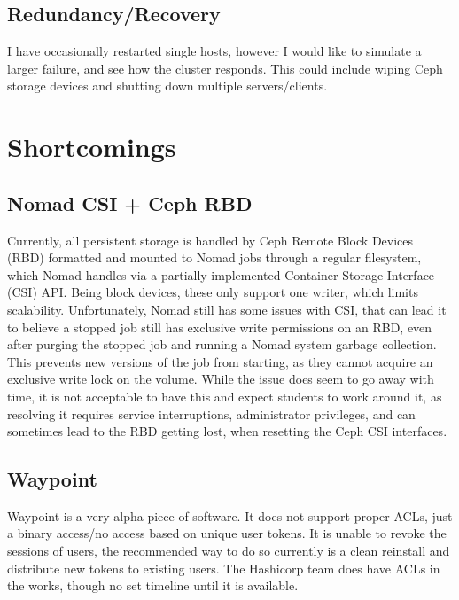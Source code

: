 \documentclass{article}
\begin{document}
\subsection{Redundancy/Recovery}
I have occasionally restarted single hosts, however I would like to simulate a larger failure, and see how the cluster responds. This could include wiping Ceph storage devices and shutting down multiple servers/clients.

\section{Shortcomings}
\subsection{Nomad CSI + Ceph RBD}
Currently, all persistent storage is handled by Ceph Remote Block Devices (RBD) formatted and mounted to Nomad jobs through a regular filesystem, which Nomad handles via a partially implemented Container Storage Interface (CSI) API. Being block devices, these only support one writer, which limits scalability. Unfortunately, Nomad still has some issues with CSI, that can lead it to believe a stopped job still has exclusive write permissions on an RBD, even after purging the stopped job and running a Nomad system garbage collection. This prevents new versions of the job from starting, as they cannot acquire an exclusive write lock on the volume. While the issue does seem to go away with time, it is not acceptable to have this and expect students to work around it, as resolving it requires service interruptions, administrator privileges, and can sometimes lead to the RBD getting lost, when resetting the Ceph CSI interfaces.

\subsection{Waypoint}
Waypoint is a very alpha piece of software. It does not support proper ACLs, just a binary access/no access based on unique user tokens. It is unable to revoke the sessions of users, the recommended way to do so currently is a clean reinstall and distribute new tokens to existing users. The Hashicorp team does have ACLs in the works, though no set timeline until it is available. 
\end{document}
